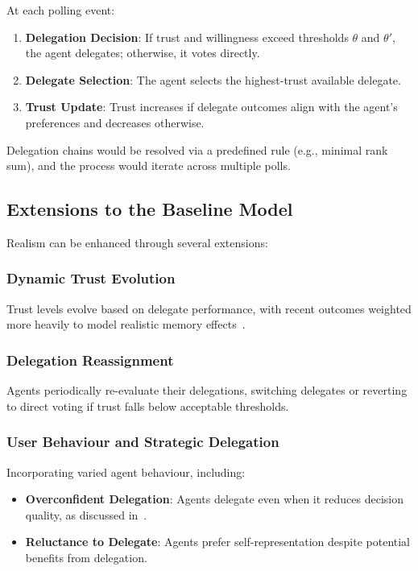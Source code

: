At each polling event:

\begin{enumerate}
    \item \textbf{Delegation Decision}: If trust and willingness exceed thresholds $\theta$ and $\theta'$, the agent delegates; otherwise, it votes directly.
    \item \textbf{Delegate Selection}: The agent selects the highest-trust available delegate.
    \item \textbf{Trust Update}: Trust increases if delegate outcomes align with the agent's preferences and decreases otherwise.
\end{enumerate}

Delegation chains would be resolved via a predefined rule (e.g., minimal rank sum), and the process would iterate across multiple polls.

\subsection{Extensions to the Baseline Model}

Realism can be enhanced through several extensions:

\subsubsection{Dynamic Trust Evolution}

Trust levels evolve based on delegate performance, with recent outcomes weighted more heavily to model realistic memory effects~\citep{casella_2022}.

\subsubsection{Delegation Reassignment}

Agents periodically re-evaluate their delegations, switching delegates or reverting to direct voting if trust falls below acceptable thresholds.

\subsubsection{User Behaviour and Strategic Delegation}

Incorporating varied agent behaviour, including:

\begin{itemize}
    \item \textbf{Overconfident Delegation}: Agents delegate even when it reduces decision quality, as discussed in~\citet{casella_2022}.
    \item \textbf{Reluctance to Delegate}: Agents prefer self-representation despite potential benefits from delegation.
\end{itemize}

